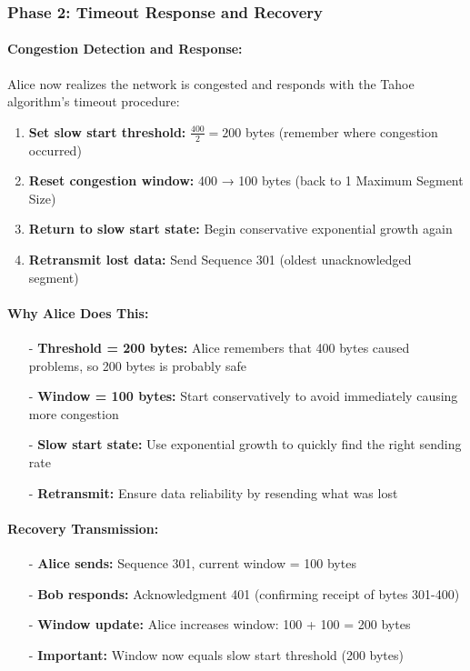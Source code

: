 \documentclass[../../compsys.tex]{subfiles}
\begin{document}
\subsubsection{Phase 2: Timeout Response and Recovery}

\paragraph{Congestion Detection and Response:}

Alice now realizes the network is congested and responds with the Tahoe algorithm's timeout procedure:

\begin{enumerate}
  \item \textbf{Set slow start threshold:} $\frac{400}{2} = 200$ bytes (remember where congestion occurred)
  \item \textbf{Reset congestion window:} 400 → 100 bytes (back to 1 Maximum Segment Size)
  \item \textbf{Return to slow start state:} Begin conservative exponential growth again
  \item \textbf{Retransmit lost data:} Send Sequence 301 (oldest unacknowledged segment)
\end{enumerate}

\paragraph{Why Alice Does This:}
\begin{itemize}
  \item[-] \textbf{Threshold = 200 bytes:} Alice remembers that 400 bytes caused problems, so 200 bytes is probably safe
  \item[-] \textbf{Window = 100 bytes:} Start conservatively to avoid immediately causing more congestion
  \item[-] \textbf{Slow start state:} Use exponential growth to quickly find the right sending rate
  \item[-] \textbf{Retransmit:} Ensure data reliability by resending what was lost
\end{itemize}

\paragraph{Recovery Transmission:}
\begin{itemize}
  \item[-] \textbf{Alice sends:} Sequence 301, current window = 100 bytes
  \item[-] \textbf{Bob responds:} Acknowledgment 401 (confirming receipt of bytes 301-400)
  \item[-] \textbf{Window update:} Alice increases window: 100 + 100 = 200 bytes
  \item[-] \textbf{Important:} Window now equals slow start threshold (200 bytes)
\end{itemize}
\end{document}
